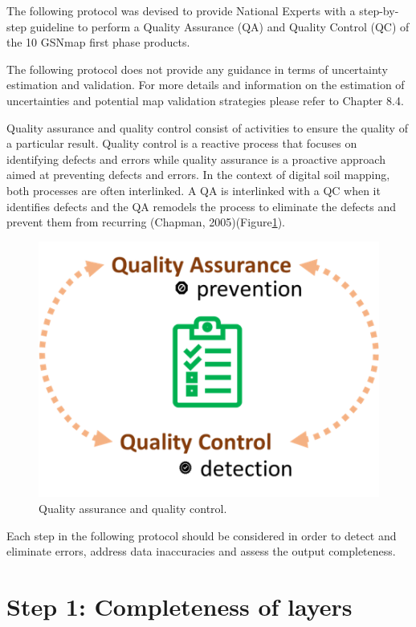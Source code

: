 \documentclass[
  10pt,
  b5paper,
  oneside]{book}
\begin{document}
The following protocol was devised to provide National Experts with a step-by-step guideline to perform a Quality Assurance (QA) and Quality Control (QC) of the 10 GSNmap first phase products.

The following protocol does not provide any guidance in terms of uncertainty estimation and validation. For more details and information on the estimation of uncertainties and potential map validation strategies please refer to Chapter 8.4.

Quality assurance and quality control consist of activities to ensure the quality of a particular result. Quality control is a reactive process that focuses on identifying defects and errors while quality assurance is a proactive approach aimed at preventing defects and errors. In the context of digital soil mapping, both processes are often interlinked. A QA is interlinked with a QC when it identifies defects and the QA remodels the process to eliminate the defects and prevent them from recurring (Chapman, 2005)(Figure\ref{fig:qaqc}).

\begin{figure}
\includegraphics[width=6.43in]{images/QA_QC} \caption{Quality assurance and quality control.}\label{fig:qaqc}
\end{figure}

Each step in the following protocol should be considered in order to detect and eliminate errors, address data inaccuracies and assess the output completeness.

\hypertarget{step-1-completeness-of-layers}{%
\section*{Step 1: Completeness of layers}\label{step-1-completeness-of-layers}}
\end{document}
